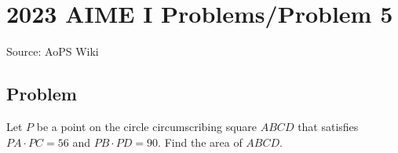 \documentclass[12pt]{article}
\begin{document}
\section*{{2023 AIME I Problems/Problem 5}}
Source: AoPS Wiki

\subsection*{Problem}
Let $P$ be a point on the circle circumscribing square $ABCD$ that satisfies $PA \cdot PC = 56$ and $PB \cdot PD = 90.$ Find the area of $ABCD.$
\end{document}
